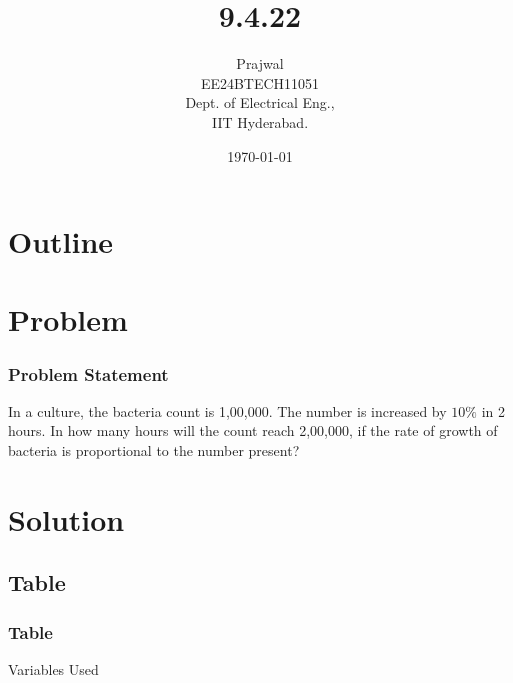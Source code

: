 \documentclass{beamer}
\title{9.4.22}
\author{Prajwal \\ EE24BTECH11051 \\ Dept. of Electrical Eng.,\\IIT Hyderabad.}
\date{\today}
\theoremstyle{remark}
\numberwithin{equation}{section}
\begin{document}
\begin{frame}
\titlepage
\end{frame}
\section*{Outline}
\begin{frame}
\tableofcontents
\end{frame}
\section{Problem}
\begin{frame}
\frametitle{Problem Statement}
In a culture, the bacteria count is 1,00,000. The number is increased by $10\%$ in 2 hours. In how many hours will the count reach 2,00,000, if the rate of growth of bacteria is proportional to the number present?
\end{frame}
\section{Solution}
\subsection{Table}
\begin{frame}[fragile]
\frametitle{Table}
    \begin{table}[h!]
        \centering
        
        \caption{Variables Used}
        \end{table}
\end{frame}

\end{document}
